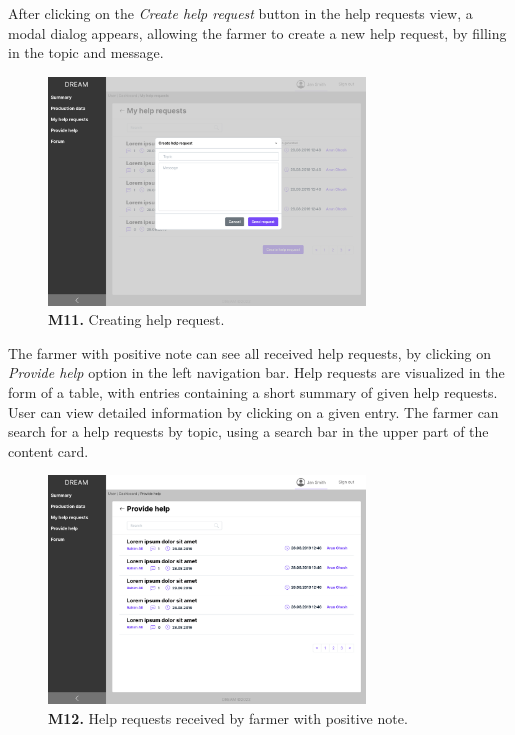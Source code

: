    After clicking on the \textit{Create help request} button in the help requests view, a modal dialog appears, allowing the farmer to create a new help request, by filling in the topic and message.
    \begin{figure}[H]
        \centering
        \includegraphics[width=0.75\textwidth]{mockups/Farmer_Dashboard_My help requests_Create help request.png}
        \caption{\textbf{M11.} Creating help request.}
    \end{figure}
    
    The farmer with positive note can see all received help requests, by clicking on \textit{Provide help} option in the left navigation bar. Help requests are visualized in the form of a table, with entries containing a short summary of given help requests. User can view detailed information by clicking on a given entry. The farmer can search for a help requests by topic, using a search bar in the upper part of the content card.
    \begin{figure}[H]
        \centering
        \includegraphics[width=0.75\textwidth]{mockups/Farmer_Dashboard_Provide help.png}
        \caption{\textbf{M12.} Help requests received by farmer with positive note.}
        \label{fig:farmer-provide-help}
    \end{figure}
    
